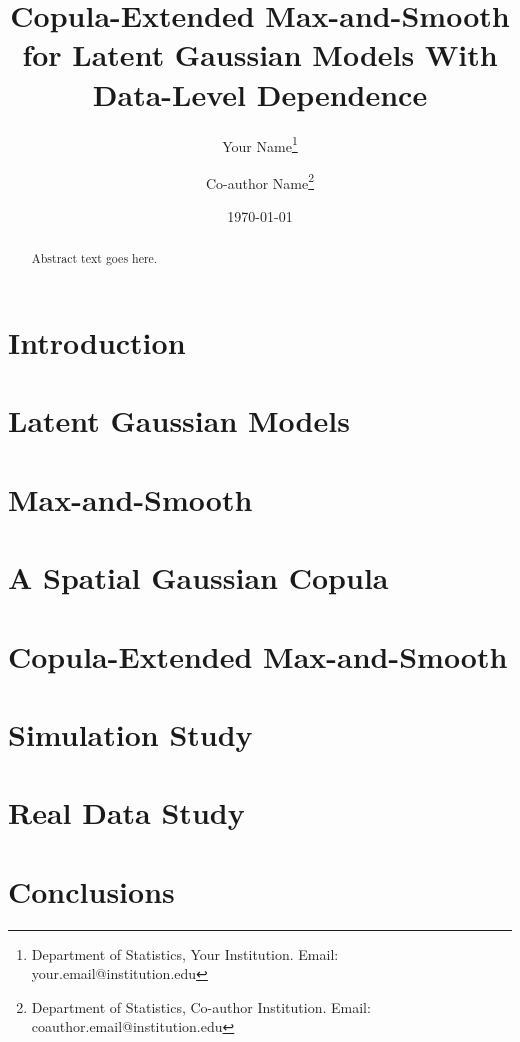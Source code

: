 \documentclass[11pt]{article}
\numberwithin{equation}{section}
\theoremstyle{plain}
\theoremstyle{definition}
\begin{document}
\title{Copula-Extended Max-and-Smooth for Latent Gaussian Models With Data-Level Dependence}

\author{Your Name\thanks{Department of Statistics, Your Institution. Email: your.email@institution.edu} \and
Co-author Name\thanks{Department of Statistics, Co-author Institution. Email: coauthor.email@institution.edu}}

\date{\today}

\maketitle

\begin{abstract}
Abstract text goes here.
\end{abstract}

\section{Introduction}


\section{Latent Gaussian Models}
\label{sec:lgm}


\section{Max-and-Smooth}
\label{sec:maxsmooth}


\section{A Spatial Gaussian Copula}
\label{sec:copulas}


\section{Copula-Extended Max-and-Smooth}
\label{sec:extended}


\section{Simulation Study}
\label{sec:simulation}


\section{Real Data Study}
\label{sec:realdata}


\section{Conclusions}
\label{sec:conclusion}




\end{document}
